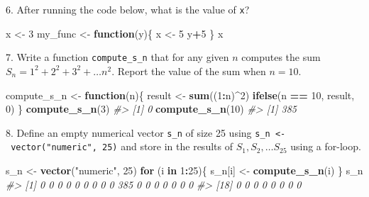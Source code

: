 \documentclass[
]{krantz}
\newenvironment{Shaded}{\begin{snugshade}}{\end{snugshade}}
\newcommand{\CommentTok}[1]{\textcolor[rgb]{0.37,0.37,0.37}{\textit{#1}}}
\newcommand{\ControlFlowTok}[1]{\textcolor[rgb]{0.27,0.27,0.27}{\textbf{#1}}}
\newcommand{\DecValTok}[1]{\textcolor[rgb]{0.06,0.06,0.06}{#1}}
\newcommand{\KeywordTok}[1]{\textcolor[rgb]{0.27,0.27,0.27}{\textbf{#1}}}
\newcommand{\NormalTok}[1]{#1}
\newcommand{\OperatorTok}[1]{\textcolor[rgb]{0.43,0.43,0.43}{\textbf{#1}}}
\newcommand{\StringTok}[1]{\textcolor[rgb]{0.5,0.5,0.5}{#1}}
\begin{document}
6. After running the code below, what is the value of \texttt{x}?

\begin{Shaded}
\begin{Highlighting}[]
\NormalTok{x <-}\StringTok{ }\DecValTok{3}
\NormalTok{my_func <-}\StringTok{ }\ControlFlowTok{function}\NormalTok{(y)\{}
\NormalTok{  x <-}\StringTok{ }\DecValTok{5}
\NormalTok{  y}\OperatorTok{+}\DecValTok{5}
\NormalTok{\}}
\NormalTok{x}
\end{Highlighting}
\end{Shaded}

7. Write a function \texttt{compute\_s\_n} that for any given \(n\) computes the sum \(S_n = 1^2 + 2^2 + 3^2 + \dots n^2\). Report the value of the sum when \(n=10\).

\begin{Shaded}
\begin{Highlighting}[]
\NormalTok{compute_s_n <-}\StringTok{ }\ControlFlowTok{function}\NormalTok{(n)\{}
\NormalTok{  result <-}\StringTok{ }\KeywordTok{sum}\NormalTok{((}\DecValTok{1}\OperatorTok{:}\NormalTok{n)}\OperatorTok{^}\DecValTok{2}\NormalTok{)}
  \KeywordTok{ifelse}\NormalTok{(n }\OperatorTok{==}\StringTok{ }\DecValTok{10}\NormalTok{, result, }\DecValTok{0}\NormalTok{)}
\NormalTok{\}}
\KeywordTok{compute_s_n}\NormalTok{(}\DecValTok{3}\NormalTok{)}
\CommentTok{#> [1] 0}
\KeywordTok{compute_s_n}\NormalTok{(}\DecValTok{10}\NormalTok{)}
\CommentTok{#> [1] 385}
\end{Highlighting}
\end{Shaded}

8. Define an empty numerical vector \texttt{s\_n} of size 25 using \texttt{s\_n\ \textless{}-\ vector("numeric",\ 25)} and store in the results of \(S_1, S_2, \dots S_{25}\) using a for-loop.

\begin{Shaded}
\begin{Highlighting}[]
\NormalTok{s_n <-}\StringTok{ }\KeywordTok{vector}\NormalTok{(}\StringTok{"numeric"}\NormalTok{, }\DecValTok{25}\NormalTok{)}
\ControlFlowTok{for}\NormalTok{ (i }\ControlFlowTok{in} \DecValTok{1}\OperatorTok{:}\DecValTok{25}\NormalTok{)\{}
\NormalTok{  s_n[i] <-}\StringTok{ }\KeywordTok{compute_s_n}\NormalTok{(i)}
\NormalTok{\}}
\NormalTok{s_n}
\CommentTok{#>  [1]   0   0   0   0   0   0   0   0   0 385   0   0   0   0   0   0   0}
\CommentTok{#> [18]   0   0   0   0   0   0   0   0}
\end{Highlighting}
\end{Shaded}
\end{document}
